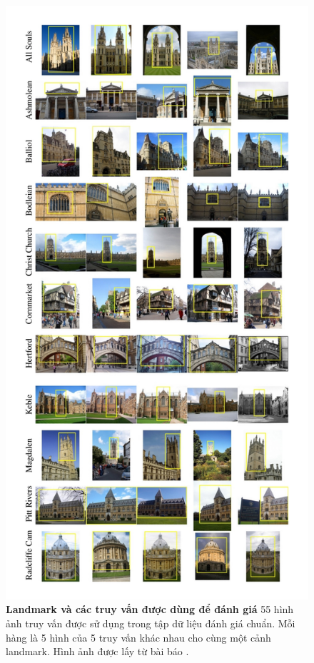 \begin{figure}[!htbp]
\begin{center}
      \includegraphics[scale=0.27]{oxfordDataset}
    \fi
    \caption[Landmark và các truy vấn được dùng để đánh giá]{\textbf{Landmark và các truy vấn được dùng để đánh giá} 55 hình ảnh truy vấn được sử dụng trong tập dữ liệu đánh giá chuẩn. Mỗi hàng là 5 hình của 5 truy vấn khác nhau cho cùng một cảnh landmark. Hình ảnh được lấy từ bài báo \citep{philbin2007object}.}
    \label{FigOxfordDataset}
  \end{center}
\end{figure}

